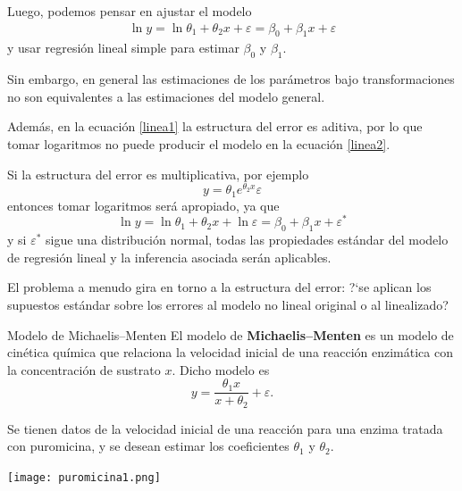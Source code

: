 \documentclass[aspectratio = 169, spanish]{beamer}
\begin{document}
\begin{frame}
    Luego, podemos pensar en ajustar el modelo
    \begin{align}\label{linea2}
        \ln y = \ln \theta_1 + \theta_2 x + \varepsilon = \beta_0 + \beta_1 x + \varepsilon
    \end{align}
    y usar regresión lineal simple para estimar $\beta_0$ y $\beta_1$.

    Sin embargo, en general las estimaciones de los parámetros bajo transformaciones no son equivalentes a las estimaciones del modelo general.

     Además, en la ecuación \eqref{linea1} la estructura del error es aditiva, por lo que tomar logaritmos no puede producir el modelo en la ecuación \eqref{linea2}.
\end{frame}

\begin{frame}
   Si la estructura del error es multiplicativa, por ejemplo
    \[
    y = \theta_1 e^{\theta_2 x} \varepsilon
    \]
    entonces tomar logaritmos será apropiado, ya que
    \[
    \ln y = \ln \theta_1 + \theta_2 x + \ln \varepsilon = \beta_0 + \beta_1 x + \varepsilon^*
    \]
    y si $\varepsilon^*$ sigue una distribución normal, todas las propiedades estándar del modelo de regresión lineal y la inferencia asociada serán aplicables.

    El problema a menudo gira en torno a la estructura del error: ?`se aplican los supuestos estándar sobre los errores al modelo no lineal original o al linealizado?
\end{frame}

\begin{frame}{Modelo de Michaelis–Menten}
    El modelo de \textbf{Michaelis–Menten} es un modelo de cinética química que relaciona la velocidad inicial de una reacción enzimática con la concentración de sustrato $x$. Dicho modelo es 
    \begin{equation}\label{Eq-Puromicina}
        y = \frac{\theta_1 x}{x+\theta_2}+\varepsilon.
    \end{equation}
    
    Se tienen datos de la velocidad inicial de una reacción para una enzima tratada con puromicina, y se desean estimar los coeficientes $\theta_1$ y $\theta_2$.
\end{frame}

\begin{frame}
    \begin{center}
        \texttt{[image: puromicina1.png]}
    \end{center}
\end{frame}
\end{document}
